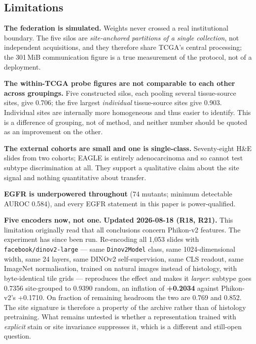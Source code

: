 \documentclass[11pt,a4paper]{article}
\begin{document}
\subsection{Limitations}

\textbf{The federation is simulated.} Weights never crossed a real institutional boundary. The
five silos are \emph{site-anchored partitions of a single collection}, not independent
acquisitions, and they therefore share TCGA's central processing; the 301\,MiB communication
figure is a true measurement of the protocol, not of a deployment.

\textbf{The within-TCGA probe figures are not comparable to each other across groupings.} Five
constructed silos, each pooling several tissue-source sites, give 0.706; the five largest
\emph{individual} tissue-source sites give 0.903. Individual sites are internally more
homogeneous and thus easier to identify. This is a difference of grouping, not of method, and
neither number should be quoted as an improvement on the other.

\textbf{The external cohorts are small and one is single-class.} Seventy-eight H\&E slides from
two cohorts; EAGLE is entirely adenocarcinoma and so cannot test subtype discrimination at all.
They support a qualitative claim about the site signal and nothing quantitative about transfer.

\textbf{EGFR is underpowered throughout} (74 mutants; minimum detectable AUROC 0.584), and every
EGFR statement in this paper is power-qualified.

\textbf{Five encoders now, not one.} \textcolor{qred}{\textbf{Updated 2026-08-18 (R18, R21).}} This
limitation originally read that all conclusions concern Phikon-v2 features. The experiment has since
been run. Re-encoding all 1{,}053 slides with \texttt{facebook/dinov2-large} --- same
\texttt{Dinov2Model} class, same 1024-dimensional width, same 24 layers, same DINOv2
self-supervision, same CLS readout, same ImageNet normalisation, trained on natural images instead
of histology, with byte-identical tile grids --- reproduces the effect and makes it \emph{larger}:
subtype goes 0.7356 site-grouped to 0.9390 random, an inflation of \textbf{+0.2034} against
Phikon-v2's +0.1710. On fraction of remaining headroom the two are 0.769 and 0.852. The site
signature is therefore a property of the archive rather than of histology pretraining. What remains
untested is whether a representation trained with \emph{explicit} stain or site invariance
suppresses it, which is a different and still-open question.
\end{document}
